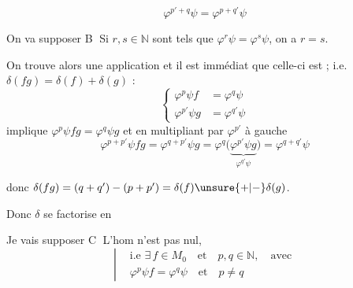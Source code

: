 
\[
\varphi^{p'+q}\psi=\varphi^{p+q'}\psi
\]

On va supposer
\textcircled{B} Si $r,s\in\mathbb N$ sont tels que $\varphi^r\psi=\varphi^s\psi$, on a $r=s$.

On trouve alors une application
et il est immédiat que celle-ci est  ; i.e. $\delta(fg)=\delta(f)+\delta(g)$ :
\[
\left\{\begin{aligned}\varphi^p\psi f&=\varphi^q\psi\\ \varphi^{p'}\psi g&=\varphi^{q'}\psi\end{aligned}\right.
\]
implique $\varphi^p\psi fg=\varphi^q\psi g$
et en multipliant par $\varphi^{p'}$ à gauche
\[
\varphi^{p+p'}\psi fg=\varphi^{q+p'}\psi g=\varphi^q\bigl(\underbrace{\varphi^{p'}\psi g}_{\varphi^{q'}\psi}\bigr)=\varphi^{q+q'}\psi
\]

donc $\delta(fg)=(q+q')-(p+p')=\delta(f)\unsure{+|-}\delta(g)$.

Donc $\delta$ se factorise en


Je vais supposer
\textcircled{C} L'hom  n'est pas nul,
\[
\left|\begin{aligned}&\text{i.e }\exists\,f\in M_0\quad\text{et}\quad p,q\in\mathbb N,\quad\text{avec}\\ &\varphi^p\psi f=\varphi^q\psi\quad\text{et}\quad p\ne q\end{aligned}\right.
\]

